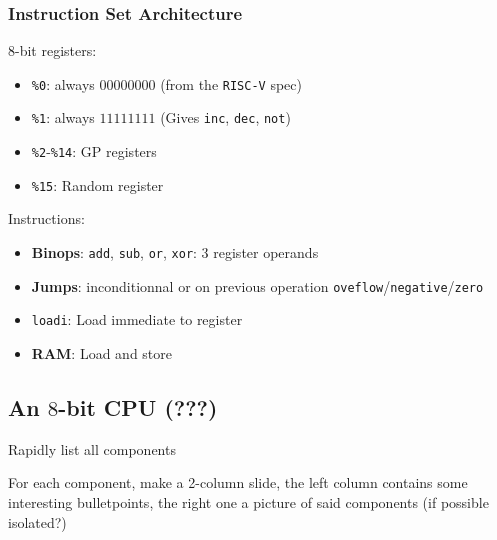 \documentclass[aspectratio=169]{beamer}
\newcommand{\rv}{\texttt{RISC-V}}
\newcommand{\vrv}{\texttt{V-\rv}}
\begin{document}
\begin{frame}
	\frametitle{Instruction Set Architecture}

	$8$-bit registers:

	\begin{itemize}
		\item \texttt{\%0}: always $00000000$ (from the \rv{} spec)
		\item \texttt{\%1}: always $11111111$ (Gives \texttt{inc},
		      \texttt{dec}, \texttt{not})
		\item \texttt{\%2}-\texttt{\%14}: GP registers
		\item \texttt{\%15}: Random register
	\end{itemize}

	\pause

	Instructions:
	\begin{itemize}
		\item \textbf{Binops}: \texttt{add}, \texttt{sub}, \texttt{or},
		      \texttt{xor}: $3$ register operands
		\item \textbf{Jumps}: inconditionnal or on previous operation
		      \texttt{oveflow}/\texttt{negative}/\texttt{zero}
		\item \texttt{loadi}: Load immediate to register
		\item \textbf{RAM}: Load and store
	\end{itemize}
\end{frame}

\subsection{An $8$-bit CPU (???)}
\begin{frame}
	Rapidly list all components

	For each component, make a 2-column slide, the left column contains some
	interesting bulletpoints, the right one a picture of said components (if
	possible isolated?)
\end{frame}
\end{document}
